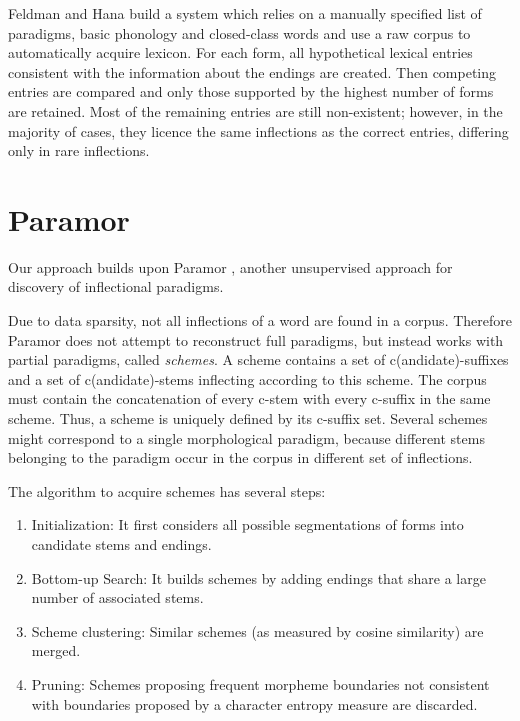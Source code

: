 \documentclass{itatnew}
\begin{document}
Feldman and Hana \cite{hana-etal-2004-emnlp,feldman-hana-2010-rodopi}
build a system which relies on a manually specified list of paradigms, basic phonology and closed-class words and use a raw corpus to automatically acquire lexicon. For each form, all hypothetical lexical entries consistent with the information about the endings are created. Then competing entries are compared and only those supported by the highest number of forms are retained. Most of the remaining entries are still non-existent; however, in the majority of cases, they licence the same inflections as the correct entries, differing only in rare inflections.


\section{Paramor}
\label{sec:paramor}

Our approach builds upon Paramor \cite{monson09}, another unsupervised approach for discovery of inflectional paradigms.

Due to data sparsity, not all inflections of a word are found in a corpus. Therefore Paramor does not attempt to reconstruct 
full paradigms, but instead works with partial paradigms, called \emph{schemes}. A scheme contains a set of c(andidate)-suffixes and a set of c(andidate)-stems inflecting according to this scheme. The corpus must contain the concatenation of every c-stem with every c-suffix in the same scheme. Thus, a scheme is uniquely defined by its c-suffix set. Several schemes might correspond to a single morphological paradigm, because different stems belonging to the paradigm occur in the corpus in different set of inflections.

The algorithm to acquire schemes has several steps:
\begin{enumerate}
\item Initialization: It first considers all possible segmentations of forms into candidate stems and endings.
\item Bottom-up Search: It builds schemes by adding endings that share a large number of associated stems.
\item Scheme clustering: Similar schemes (as measured by cosine similarity) are merged.
\item Pruning: Schemes proposing frequent morpheme boundaries not consistent with boundaries proposed by a character entropy measure are discarded.
\end{enumerate}
\end{document}
